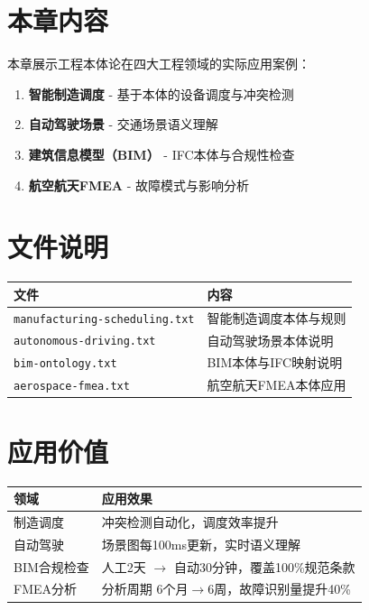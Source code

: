 
\section{本章内容}

本章展示工程本体论在四大工程领域的实际应用案例：

\begin{enumerate}
\item \textbf{智能制造调度} - 基于本体的设备调度与冲突检测
\item \textbf{自动驾驶场景} - 交通场景语义理解
\item \textbf{建筑信息模型（BIM）} - IFC本体与合规性检查
\item \textbf{航空航天FMEA} - 故障模式与影响分析
\end{enumerate}

\section{文件说明}

\begin{center}
\begin{tabular}{@{}ll@{}}
\toprule
\textbf{文件} & \textbf{内容} \\
\midrule
\texttt{manufacturing-scheduling.txt} & 智能制造调度本体与规则 \\
\texttt{autonomous-driving.txt} & 自动驾驶场景本体说明 \\
\texttt{bim-ontology.txt} & BIM本体与IFC映射说明 \\
\texttt{aerospace-fmea.txt} & 航空航天FMEA本体应用 \\
\bottomrule
\end{tabular}
\end{center}

\section{应用价值}

\begin{center}
\begin{tabular}{@{}ll@{}}
\toprule
\textbf{领域} & \textbf{应用效果} \\
\midrule
制造调度 & 冲突检测自动化，调度效率提升 \\
自动驾驶 & 场景图每100ms更新，实时语义理解 \\
BIM合规检查 & 人工2天 \(\rightarrow\) 自动30分钟，覆盖100\%规范条款 \\
FMEA分析 & 分析周期 6个月\(\rightarrow\)6周，故障识别量提升40\% \\
\bottomrule
\end{tabular}
\end{center}
